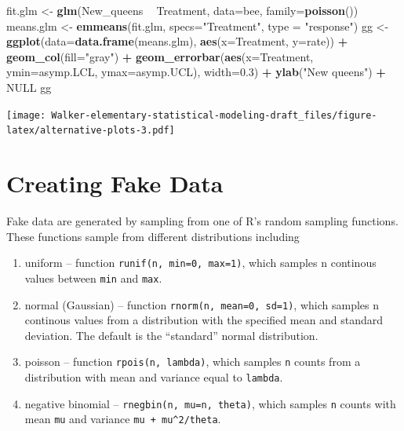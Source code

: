 \documentclass[]{book}
\newenvironment{Shaded}{\begin{snugshade}}{\end{snugshade}}
\newcommand{\KeywordTok}[1]{\textcolor[rgb]{0.13,0.29,0.53}{\textbf{#1}}}
\newcommand{\DataTypeTok}[1]{\textcolor[rgb]{0.13,0.29,0.53}{#1}}
\newcommand{\FloatTok}[1]{\textcolor[rgb]{0.00,0.00,0.81}{#1}}
\newcommand{\StringTok}[1]{\textcolor[rgb]{0.31,0.60,0.02}{#1}}
\newcommand{\OtherTok}[1]{\textcolor[rgb]{0.56,0.35,0.01}{#1}}
\newcommand{\OperatorTok}[1]{\textcolor[rgb]{0.81,0.36,0.00}{\textbf{#1}}}
\newcommand{\NormalTok}[1]{#1}
\providecommand{\tightlist}{%
  \setlength{\itemsep}{0pt}\setlength{\parskip}{0pt}}
\begin{document}
\begin{Shaded}
\begin{Highlighting}[]
\NormalTok{fit.glm <-}\StringTok{ }\KeywordTok{glm}\NormalTok{(New_queens }\OperatorTok{~}\StringTok{ }\NormalTok{Treatment, }\DataTypeTok{data=}\NormalTok{bee, }\DataTypeTok{family=}\KeywordTok{poisson}\NormalTok{())}
\NormalTok{means.glm <-}\StringTok{ }\KeywordTok{emmeans}\NormalTok{(fit.glm, }\DataTypeTok{specs=}\StringTok{"Treatment"}\NormalTok{, }\DataTypeTok{type =} \StringTok{"response"}\NormalTok{)}
\NormalTok{gg <-}\StringTok{ }\KeywordTok{ggplot}\NormalTok{(}\DataTypeTok{data=}\KeywordTok{data.frame}\NormalTok{(means.glm), }\KeywordTok{aes}\NormalTok{(}\DataTypeTok{x=}\NormalTok{Treatment, }\DataTypeTok{y=}\NormalTok{rate)) }\OperatorTok{+}
\StringTok{  }\KeywordTok{geom_col}\NormalTok{(}\DataTypeTok{fill=}\StringTok{"gray"}\NormalTok{) }\OperatorTok{+}\StringTok{ }
\StringTok{  }\KeywordTok{geom_errorbar}\NormalTok{(}\KeywordTok{aes}\NormalTok{(}\DataTypeTok{x=}\NormalTok{Treatment, }\DataTypeTok{ymin=}\NormalTok{asymp.LCL, }\DataTypeTok{ymax=}\NormalTok{asymp.UCL), }\DataTypeTok{width=}\FloatTok{0.3}\NormalTok{) }\OperatorTok{+}
\StringTok{  }\KeywordTok{ylab}\NormalTok{(}\StringTok{"New queens"}\NormalTok{) }\OperatorTok{+}
\StringTok{  }\OtherTok{NULL}
\NormalTok{gg}
\end{Highlighting}
\end{Shaded}

\texttt{[image: Walker-elementary-statistical-modeling-draft\_files/figure-latex/alternative-plots-3.pdf]}

\section{Creating Fake Data}\label{creating-fake-data}

Fake data are generated by sampling from one of R's random sampling
functions. These functions sample from different distributions including

\begin{enumerate}
\def\labelenumi{\arabic{enumi}.}
\tightlist
\item
  uniform -- function \texttt{runif(n,\ min=0,\ max=1)}, which samples n
  continous values between \texttt{min} and \texttt{max}.
\item
  normal (Gaussian) -- function \texttt{rnorm(n,\ mean=0,\ sd=1)}, which
  samples n continous values from a distribution with the specified mean
  and standard deviation. The default is the ``standard'' normal
  distribution.
\item
  poisson -- function \texttt{rpois(n,\ lambda)}, which samples
  \texttt{n} counts from a distribution with mean and variance equal to
  \texttt{lambda}.
\item
  negative binomial -- \texttt{rnegbin(n,\ mu=n,\ theta)}, which samples
  \texttt{n} counts with mean \texttt{mu} and variance
  \texttt{mu\ +\ mu\^{}2/theta}.
\end{enumerate}
\end{document}
